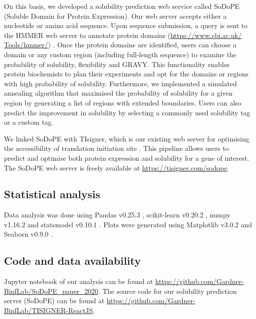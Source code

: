 On this basis, we developed a solubility prediction web service called SoDoPE (Soluble Domain for Protein Expression). Our web server accepts either a nucleotide or amino acid sequence. Upon sequence submission, a query is sent to the HMMER web server to annotate protein domains (\href{https://www.ebi.ac.uk/Tools/hmmer/}{https://www.ebi.ac.uk/\\Tools/hmmer/}) \citep{Potter2018-ox}. Once the protein domains are identified, users can choose a domain or any custom region (including full-length sequence) to examine the probability of solubility, flexibility and GRAVY. This functionality enables protein biochemists to plan their experiments and opt for the domains or regions with high probability of solubility. Furthermore, we implemented a simulated annealing algorithm that maximised the probability of solubility for a given region by generating a list of regions with extended boundaries. Users can also predict the improvement in solubility by selecting a commonly used solubility tag or a custom tag.

We linked SoDoPE with TIsigner, which is our existing web server for optimising the accessibility of translation initiation site \citep{Bhandari2021-wd}. This pipeline allows users to predict and optimise both protein expression and solubility for a gene of interest. The SoDoPE web server is freely available at \href{https://tisigner.com/sodope}{https://tisigner.com/sodope}.

\subsection{Statistical analysis}
Data analysis was done using Pandas v0.25.3 \citep{McKinney2010-rg}, scikit-learn v0.20.2 \citep{Pedregosa2011-cd}, numpy v1.16.2 \citep{Van_der_Walt2011-hv} and statsmodel v0.10.1 \citep{Seabold2010-qk}. Plots were generated using Matplotlib v3.0.2 \citep{Caswell2018-pc} and Seaborn v0.9.0 \citep{Waskom2014-ar}. 


\subsection{Code and data availability}
Jupyter notebook of our analysis can be found at \href{https://github.com/Gardner-BinfLab/SoDoPE\_paper\_2020}{https://github.com/Gardner-BinfLab/SoDoPE\_paper\_2020}. The source code for our solubility prediction server (SoDoPE) can be found at \href{https://github.com/Gardner-BinfLab/TISIGNER-ReactJS}{https://github.com/Gardner-BinfLab/TISIGNER-ReactJS}.

